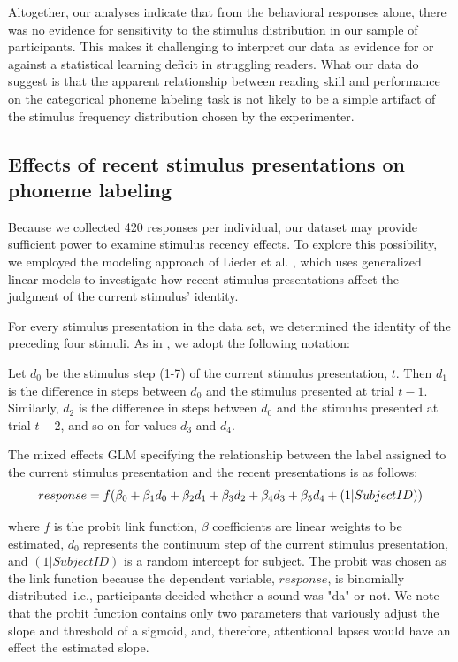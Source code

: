 \documentclass[../uwthesis.tex]{subfiles}
\begin{document}
Altogether, our analyses indicate that from the behavioral responses alone, there was no evidence for sensitivity to the stimulus distribution in our sample of participants. This makes it challenging to interpret our data as evidence for or against a statistical learning deficit in struggling readers. What our data do suggest is that the apparent relationship between reading skill and performance on the categorical phoneme labeling task is not likely to be a simple artifact of the stimulus frequency distribution chosen by the experimenter. 

\subsection{Effects of recent stimulus presentations on phoneme labeling}
Because we collected 420 responses per individual, our dataset may provide sufficient power to examine stimulus recency effects. To explore this possibility, we employed the modeling approach of Lieder et al. \citep{Lieder2019PerceptualDyslexia}, which uses generalized linear models to investigate how recent stimulus presentations affect the judgment of the current stimulus' identity. 

For every stimulus presentation in the data set, we determined the identity of the preceding four stimuli. As in \citep{Lieder2019PerceptualDyslexia}, we adopt the following notation:

Let $d_0$ be the stimulus step (1-7) of the current stimulus presentation, $t$. Then $d_1$ is the difference in steps between $d_0$ and the stimulus presented at trial $t-1$. Similarly, $d_2$ is the difference in steps between $d_0$ and the stimulus presented at trial $t-2$, and so on for values $d_3$ and $d_4$.

The mixed effects GLM specifying the relationship between the label assigned to the current stimulus presentation and the recent presentations is as follows:
\begin{equation}
\label{eqn:GLM}
\centering
response = f(\beta_0 + \beta_1d_0 + \beta_2d_1 + \beta_3d_2 + \beta_4d_3 + \beta_5d_4 + (1|Subject ID))
\end{equation}

where $f$ is the probit link function, $\beta$ coefficients are linear weights to be estimated, $d_0$ represents the continuum step of the current stimulus presentation, and $(1|Subject ID)$ is a random intercept for subject. The probit was chosen as the link function because the dependent variable, $response$, is binomially distributed--i.e., participants decided whether a sound was "da" or not. We note that the probit function contains only two parameters that variously adjust the slope and threshold of a sigmoid, and, therefore, attentional lapses would have an effect the estimated slope. 
\end{document}
